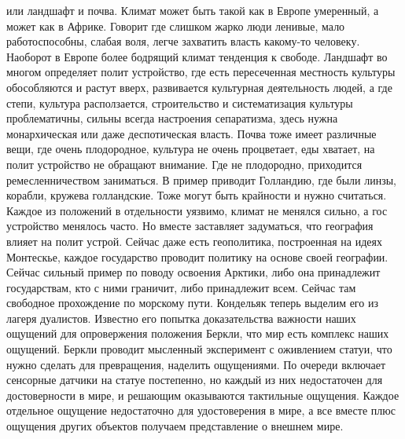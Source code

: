 \documentclass[a4paper, 12pt]{article}
\begin{document}
или ландшафт и почва. Климат может быть такой как в Европе умеренный, 
а может как в Африке. Говорит где слишком жарко люди ленивые, мало 
работоспособны, слабая воля, легче захватить власть какому-то человеку. 
Наоборот в Европе более бодрящий климат тенденция к свободе. Ландшафт во 
многом определяет полит устройство, где есть пересеченная местность 
культуры обособляются и растут вверх, развивается культурная 
деятельность людей, а где степи, культура расползается, строительство 
и систематизация культуры проблематичны, сильны всегда настроения 
сепаратизма, здесь нужна монархическая или даже деспотическая власть. 
Почва тоже имеет различные вещи, где очень плодородное, культура не 
очень процветает, еды хватает, на полит устройство не обращают внимание. 
Где не плодородно, приходится ремесленничеством заниматься. В пример 
приводит Голландию, где были линзы, корабли, кружева голландские. Тоже 
могут быть крайности и нужно считаться. Каждое из положений 
в отдельности уязвимо, климат не менялся сильно, а гос устройство 
менялось часто. Но вместе заставляет задуматься, что география влияет на 
полит устрой. Сейчас даже есть геополитика, построенная на идеях 
Монтескье, каждое государство проводит политику на основе своей 
географии. Сейчас сильный пример по поводу освоения Арктики, либо она 
принадлежит государствам, кто с ними граничит, либо принадлежит всем. 
Сейчас там свободное прохождение по морскому пути. Кондельяк теперь 
выделим его из лагеря дуалистов. Известно его попытка доказательства 
важности наших ощущений для опровержения положения Беркли, что мир есть 
комплекс наших ощущений. Беркли проводит мысленный эксперимент 
с оживлением статуи, что нужно сделать для превращения, наделить 
ощущениями. По очереди включает сенсорные датчики на статуе постепенно, 
но каждый из них недостаточен для достоверности в мире, и решающим 
оказываются тактильные ощущения. Каждое отдельное ощущение недостаточно 
для удостоверения в мире, а все вместе плюс ощущения других объектов 
получаем представление о внешнем мире.
\end{document}
